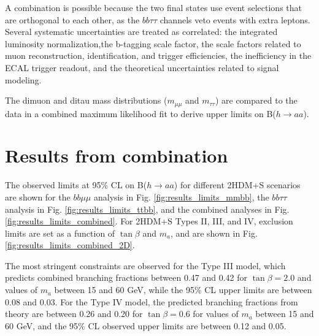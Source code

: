 A combination is possible because the two final states use event selections that are orthogonal to each other, as the $bb\tau\tau$ channels veto events with extra leptons. Several systematic uncertainties are treated as correlated: the integrated luminosity normalization,the b-tagging scale factor, the scale factors related to muon reconstruction, identification, and trigger efficiencies, the inefficiency in the ECAL trigger readout, and the theoretical uncertainties related to signal modeling.

The dimuon and ditau mass distributions ($m_{\mu\mu}$ and $m_{\tau\tau}$) are compared to the data in a combined maximum likelihood fit to derive upper limits on B($h\rightarrow aa$). 

\section{Results from combination}

The observed limits at 95\% CL on B($h \rightarrow aa$) for different 2HDM+S scenarios are shown for the $bb\mu\mu$ analysis in Fig. \ref{fig:results_limits_mmbb}, the $bb\tau\tau$ analysis in Fig. \ref{fig:results_limits_ttbb}, and the combined analyses in Fig. \ref{fig:results_limits_combined}. For 2HDM+S Types II, III, and IV, exclusion limits are set as a function of $\tan\beta$ and $m_{a}$, and are shown in Fig. \ref{fig:results_limits_combined_2D}.

The most stringent constraints are observed for the Type III model, which predicts combined branching fractions between 0.47 and 0.42 for $\tan\beta = 2.0$ and values of $m_{a}$ between 15 and 60 GeV, while the 95\% CL upper limits are between 0.08 and 0.03. For the Type IV model, the predicted branching fractions from theory are between 0.26 and 0.20 for $\tan\beta = 0.6$ for values of $m_{a}$ between 15 and 60 GeV, and the 95\% CL observed upper limits are between 0.12 and 0.05. 

